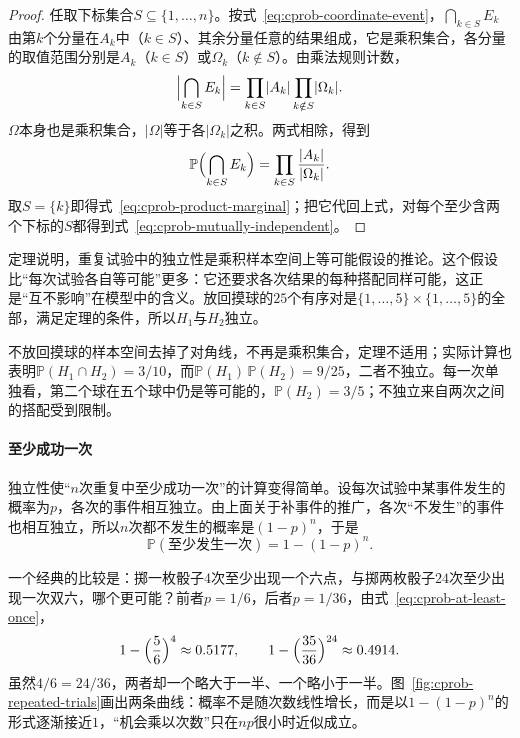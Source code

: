 \begin{proof}
任取下标集合$S\subseteq\{1,\ldots,n\}$。按式~\eqref{eq:cprob-coordinate-event}，$\bigcap_{k\in S}E_k$由第$k$个分量在$A_k$中（$k\in S$）、其余分量任意的结果组成，它是乘积集合，各分量的取值范围分别是$A_k$（$k\in S$）或$\Omega_k$（$k\notin S$）。由乘法规则计数，
\[
 \Bigl\lvert\bigcap_{k\in S}E_k\Bigr\rvert=\prod_{k\in S}\lvert A_k\rvert\prod_{k\notin S}\lvert\Omega_k\rvert.
\]
$\Omega$本身也是乘积集合，$\lvert\Omega\rvert$等于各$\lvert\Omega_k\rvert$之积。两式相除，得到
\[
 \mathbb{P}\Bigl(\bigcap_{k\in S}E_k\Bigr)=\prod_{k\in S}\frac{\lvert A_k\rvert}{\lvert\Omega_k\rvert}.
\]
取$S=\{k\}$即得式~\eqref{eq:cprob-product-marginal}；把它代回上式，对每个至少含两个下标的$S$都得到式~\eqref{eq:cprob-mutually-independent}。
\end{proof}

定理说明，重复试验中的独立性是乘积样本空间上等可能假设的推论。这个假设比“每次试验各自等可能”更多：它还要求各次结果的每种搭配同样可能，这正是“互不影响”在模型中的含义。放回摸球的$25$个有序对是$\{1,\ldots,5\}\times\{1,\ldots,5\}$的全部，满足定理的条件，所以$H_1$与$H_2$独立。

不放回摸球的样本空间去掉了对角线，不再是乘积集合，定理不适用；实际计算也表明$\mathbb{P}(H_1\cap H_2)=3/10$，而$\mathbb{P}(H_1)\,\mathbb{P}(H_2)=9/25$，二者不独立。每一次单独看，第二个球在五个球中仍是等可能的，$\mathbb{P}(H_2)=3/5$；不独立来自两次之间的搭配受到限制。

\paragraph{至少成功一次}
独立性使“$n$次重复中至少成功一次”的计算变得简单。设每次试验中某事件发生的概率为$p$，各次的事件相互独立。由上面关于补事件的推广，各次“不发生”的事件也相互独立，所以$n$次都不发生的概率是$(1-p)^{n}$，于是
\begin{equation}
 \mathbb{P}(\text{至少发生一次})=1-(1-p)^{n}.
 \label{eq:cprob-at-least-once}
\end{equation}

一个经典的比较是：掷一枚骰子$4$次至少出现一个六点，与掷两枚骰子$24$次至少出现一次双六，哪个更可能？前者$p=1/6$，后者$p=1/36$，由式~\eqref{eq:cprob-at-least-once}，
\[
 1-\Bigl(\frac56\Bigr)^{4}\approx0.5177,\qquad
 1-\Bigl(\frac{35}{36}\Bigr)^{24}\approx0.4914.
\]
虽然$4/6=24/36$，两者却一个略大于一半、一个略小于一半。图~\ref{fig:cprob-repeated-trials}画出两条曲线：概率不是随次数线性增长，而是以$1-(1-p)^{n}$的形式逐渐接近$1$，“机会乘以次数”只在$np$很小时近似成立。

